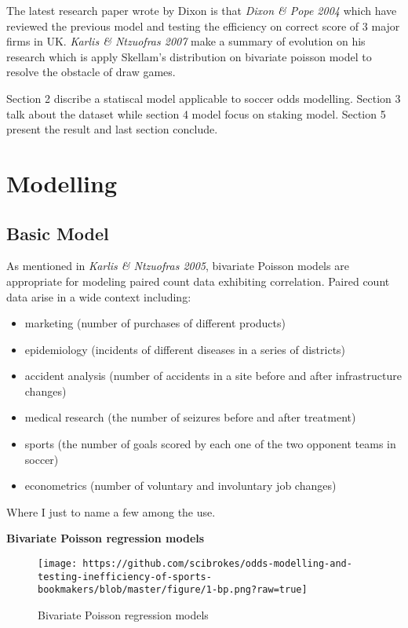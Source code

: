 \documentclass[article]{jss}
\providecommand{\tightlist}{%
  \setlength{\itemsep}{0pt}\setlength{\parskip}{0pt}}
\begin{document}
The latest research paper wrote by Dixon is that \emph{Dixon \& Pope
2004} which have reviewed the previous model and testing the efficiency
on correct score of 3 major firms in UK. \emph{Karlis \& Ntzuofras 2007}
make a summary of evolution on his research which is apply Skellam's
distribution on bivariate poisson model to resolve the obstacle of draw
games. \bigbreak

Section 2 discribe a statiscal model applicable to soccer odds
modelling. Section 3 talk about the dataset while section 4 model focus
on staking model. Section 5 present the result and last section
conclude.

\section{Modelling}\label{modelling}

\subsection{Basic Model}\label{basic-model}

As mentioned in \emph{Karlis \& Ntzuofras 2005}, bivariate Poisson
models are appropriate for modeling paired count data exhibiting
correlation. Paired count data arise in a wide context including:

\begin{itemize}
\tightlist
\item
  marketing (number of purchases of different products)
\item
  epidemiology (incidents of different diseases in a series of
  districts)
\item
  accident analysis (number of accidents in a site before and after
  infrastructure changes)
\item
  medical research (the number of seizures before and after treatment)
\item
  sports (the number of goals scored by each one of the two opponent
  teams in soccer)
\item
  econometrics (number of voluntary and involuntary job changes)
\end{itemize}

Where I just to name a few among the use. \bigbreak

\textbf{Bivariate Poisson regression models} \bigbreak

\begin{figure}[htbp]
\centering
\texttt{[image: https://github.com/scibrokes/odds-modelling-and-testing-inefficiency-of-sports-bookmakers/blob/master/figure/1-bp.png?raw=true]}
\caption{Bivariate Poisson regression models}
\end{figure}
\end{document}

